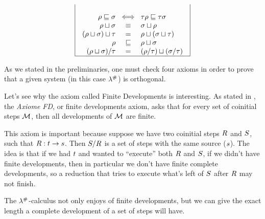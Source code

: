 {\[\begin{array}{|c|c|c|}
\begin{array}{r@{\hspace{0.2cm}}c@{\hspace{0.2cm}}l}
\\
  \redseq \permle \redseqtwo & \iff & \redseqthree\redseq \permle \redseqthree\redseqtwo
\\
  \redseq \sqcup \redseqtwo  & \permeq & \redseqtwo \sqcup \redseq
\\
  (\redseq \sqcup \redseqtwo) \sqcup \redseqthree & = & \redseq \sqcup (\redseqtwo \sqcup \redseqthree)
\\
  \redseq & \permle & \redseq \sqcup \redseqtwo
\\
  (\redseq \sqcup \redseqtwo)/\redseqthree & = & (\redseq/\redseqthree) \sqcup (\redseqtwo/\redseqthree) \\
\end{array}
\\
\hline
\end{array}
\]
}

As we stated in the preliminaries, one must check four axioms in order to prove that
a given system (in this case $\lambda^{\mathtt{\#}}$) is orthogonal.

Let's see why the axiom called Finite Developments is interesting.
As stated in \cite{thesismellies}, the \emph{Axiome FD}, or finite developments axiom,
asks that for every set of coinitial steps $\mathcal{M}$, then all developments of $\mathcal{M}$
are finite.

This axiom is important because suppose we have two coinitial steps $R$ and $S$,
such that $R : t \to s$. Then $S / R$ is a set of steps with
the same source ($s$). The idea is that if we had $t$ and wanted to ``execute'' both
$R$ and $S$, if we didn't have finite developments, then in particular
we don't have finite complete developments, so a reduction that tries to
execute what's left of $S$ after $R$ may not finish.

The $\lambda^{\mathtt{\#}}$-calculus not only enjoys of finite developments, but we can
give the exact length a complete development of a set of steps will have.

